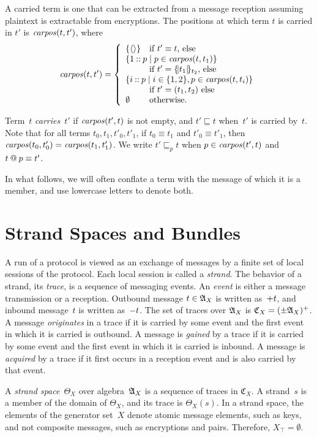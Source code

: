 \documentclass[12pt]{article}
\theoremstyle{definition}
\newcommand{\alga}{\alg{A}}
\newcommand{\tr}{\ensuremath{\mathfrak C}}
\newcommand{\carpos}{\fn{carpos}}
\begin{document}
A carried term is one that can be extracted from a message reception
assuming plaintext is extractable from encryptions.  The
positions at which term $t$ is carried in
$t'$ is $\carpos(t,t')$, where
$$\carpos(t,t')=\left\{
\begin{array}{ll}
\{\seq{}\}&\mbox{if $t'\equiv t$, else}\\
\multicolumn{2}{l}{\{1\cons p \mid
p\in\carpos(t,t_1)\}}\\
& \mbox{if $t'=\enc{t_1}{t_2}$, else}\\
\multicolumn{2}{l}{\{i\cons p \mid
i\in\{1,2\}, p\in\carpos(t,t_i)\}} \\
& \mbox{if $t'=(t_1,t_2)$ else}\\
\emptyset&\mbox{otherwise.}
\end{array}\right.$$

Term~$t$ \emph{carries}~$t'$ if $\carpos(t',t)$ is not empty, and
$t'\sqsubseteq t$ when~$t'$ is carried by~$t$.  Note that for all
terms $t_0,t_1,t'_0,t'_1$, if $t_0\equiv t_1$ and $t'_0\equiv t'_1$,
then $\carpos(t_0,t'_0)= \carpos(t_1,t'_1)$.  We write $t' \sqsubseteq_p t$
when $p \in \carpos(t',t)$ and $t \mathbin{@} p \equiv t'$.

In what follows, we will often conflate a term with the message of
which it is a member, and use lowercase letters to denote both.

\section{Strand Spaces and Bundles}\label{sec:strand spaces and bundles}

A run of a protocol is viewed as an exchange of messages by a finite
set of local sessions of the protocol.  Each local session is called a
\emph{strand}.  The behavior of a strand, its \emph{trace}, is a
sequence of messaging events.  An \emph{event} is either a message
transmission or a reception.  Outbound message $t\in\alga_X$ is
written as~$\mathord + t$, and inbound message~$t$ is written as~$\mathord -
t$.  The set of traces over $\alga_X$ is $\tr_X=(\pm\alga_X)^+$.  A
message \emph{originates} in a trace if it is carried by some event
and the first event in which it is carried is outbound.  A message is
\emph{gained} by a trace if it is carried by some event and the first
event in which it is carried is inbound.  A message is \emph{acquired}
by a trace if it first occurs in a reception event and is also carried
by that event.

A \emph{strand space}~$\Theta_X$ over algebra~$\alga_X$ is a sequence
of traces in $\tr_X$.  A strand~$s$ is a member of the domain of
$\Theta_X$, and its trace is $\Theta_X(s)$.  In a strand space, the
elements of the generator set~$X$ denote atomic message elements, such
as keys, and not composite messages, such as encryptions and pairs.
Therefore, $X_\top=\emptyset$.
\end{document}
